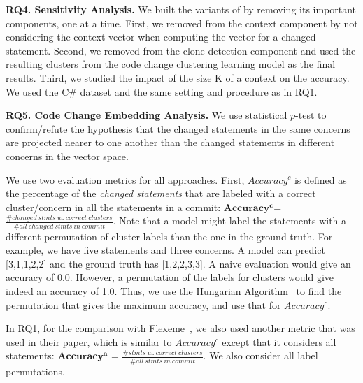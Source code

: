 \noindent\textbf{RQ4. Sensitivity Analysis.} We built the variants of {\tool} by removing its important components,
one at a time. First, we removed from {\tool} the context component by
not considering the context vector when computing the vector
for a changed statement. Second, we removed from {\tool} the
clone detection component and used the resulting clusters from the
code change clustering learning model as the final results. Third, we studied the impact of the size K of a context on the accuracy. 
We used the C\# dataset and the same setting and procedure as in RQ1.


\noindent\textbf{RQ5. Code Change Embedding Analysis.} We use statistical $p$-test to confirm/refute the hypothesis
that the changed statements in the same concerns are
projected nearer to one another than the changed statements in
different concerns in the vector space.




 We use two evaluation metrics for
all approaches. First, $Accuracy^{c}$ is defined as the percentage of
the {\em changed statements} that are labeled with a correct
cluster/concern in all the statements in a commit: $\mathbf{Accuracy^{c}}$=
$\frac{\# changed\:stmts\:w.\:correct\:clusters}{\#
all\:changed\:stmts\:in\:commit}$.  Note that a model might label the
statements with a different permutation of cluster labels than the one
in the ground truth. For example, we have five statements and three
concerns. A model can predict [3,1,1,2,2] and the ground truth has
[1,2,2,3,3]. A naive evaluation would give an accuracy of
0.0. However, a permutation of the labels for clusters would give
indeed an accuracy of 1.0. Thus, we use the Hungarian
Algorithm~\cite{hungarian-algo} to find the permutation that gives the
maximum accuracy, and use that for $Accuracy^{c}$.

In RQ1, for the comparison with Flexeme~\cite{flexeme-fse20}, we also
used another metric that was used in their paper, which is similar to
$Accuracy^{c}$ except that it considers all statements: $\mathbf{Accuracy^{a}}$
= $\frac{\# stmts\:w.\:correct\:clusters}{\# all\:stmts\:in\:commit}$.
We also consider all label permutations.


